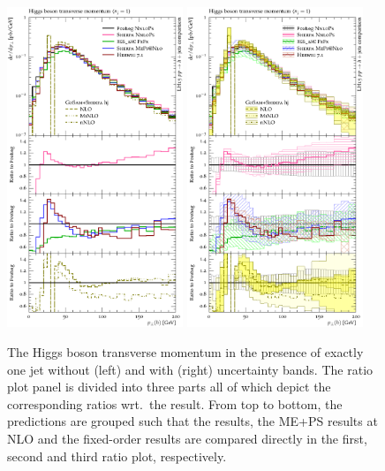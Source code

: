 \begin{figure}[t!]
  \centering
  \includegraphics[width=0.47\textwidth]{figures/hjetscomp_u_H_j_pT_excl.pdf}
  \hfill
  \includegraphics[width=0.47\textwidth]{figures/hjetscomp_H_j_pT_excl.pdf}
  \caption{\label{fig:hjetscomp:results:1obs:hpt_excl}%
    The Higgs boson transverse momentum in the presence of exactly one
    jet without (left) and with (right) uncertainty bands. The ratio
    plot panel is divided into three parts all of which depict the
    corresponding ratios wrt.~the \Powheg \NNLOPS result. From top to
    bottom, the predictions are grouped such that the \NNLOPS results,
    the ME+PS results at NLO and the fixed-order results are compared
    directly in the first, second and third ratio plot, respectively.}
\end{figure}


